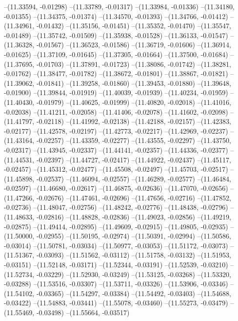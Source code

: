 --(11.33594, -0.01298)
--(11.33789, -0.01317)
--(11.33984, -0.01336)
--(11.34180, -0.01355)
--(11.34375, -0.01374)
--(11.34570, -0.01393)
--(11.34766, -0.01412)
--(11.34961, -0.01432)
--(11.35156, -0.01451)
--(11.35352, -0.01470)
--(11.35547, -0.01489)
--(11.35742, -0.01509)
--(11.35938, -0.01528)
--(11.36133, -0.01547)
--(11.36328, -0.01567)
--(11.36523, -0.01586)
--(11.36719, -0.01606)
--(11.36914, -0.01625)
--(11.37109, -0.01645)
--(11.37305, -0.01664)
--(11.37500, -0.01684)
--(11.37695, -0.01703)
--(11.37891, -0.01723)
--(11.38086, -0.01742)
--(11.38281, -0.01762)
--(11.38477, -0.01782)
--(11.38672, -0.01801)
--(11.38867, -0.01821)
--(11.39062, -0.01841)
--(11.39258, -0.01860)
--(11.39453, -0.01880)
--(11.39648, -0.01900)
--(11.39844, -0.01919)
--(11.40039, -0.01939)
--(11.40234, -0.01959)
--(11.40430, -0.01979)
--(11.40625, -0.01999)
--(11.40820, -0.02018)
--(11.41016, -0.02038)
--(11.41211, -0.02058)
--(11.41406, -0.02078)
--(11.41602, -0.02098)
--(11.41797, -0.02118)
--(11.41992, -0.02138)
--(11.42188, -0.02157)
--(11.42383, -0.02177)
--(11.42578, -0.02197)
--(11.42773, -0.02217)
--(11.42969, -0.02237)
--(11.43164, -0.02257)
--(11.43359, -0.02277)
--(11.43555, -0.02297)
--(11.43750, -0.02317)
--(11.43945, -0.02337)
--(11.44141, -0.02357)
--(11.44336, -0.02377)
--(11.44531, -0.02397)
--(11.44727, -0.02417)
--(11.44922, -0.02437)
--(11.45117, -0.02457)
--(11.45312, -0.02477)
--(11.45508, -0.02497)
--(11.45703, -0.02517)
--(11.45898, -0.02537)
--(11.46094, -0.02557)
--(11.46289, -0.02577)
--(11.46484, -0.02597)
--(11.46680, -0.02617)
--(11.46875, -0.02636)
--(11.47070, -0.02656)
--(11.47266, -0.02676)
--(11.47461, -0.02696)
--(11.47656, -0.02716)
--(11.47852, -0.02736)
--(11.48047, -0.02756)
--(11.48242, -0.02776)
--(11.48438, -0.02796)
--(11.48633, -0.02816)
--(11.48828, -0.02836)
--(11.49023, -0.02856)
--(11.49219, -0.02875)
--(11.49414, -0.02895)
--(11.49609, -0.02915)
--(11.49805, -0.02935)
--(11.50000, -0.02955)
--(11.50195, -0.02974)
--(11.50391, -0.02994)
--(11.50586, -0.03014)
--(11.50781, -0.03034)
--(11.50977, -0.03053)
--(11.51172, -0.03073)
--(11.51367, -0.03093)
--(11.51562, -0.03112)
--(11.51758, -0.03132)
--(11.51953, -0.03151)
--(11.52148, -0.03171)
--(11.52344, -0.03191)
--(11.52539, -0.03210)
--(11.52734, -0.03229)
--(11.52930, -0.03249)
--(11.53125, -0.03268)
--(11.53320, -0.03288)
--(11.53516, -0.03307)
--(11.53711, -0.03326)
--(11.53906, -0.03346)
--(11.54102, -0.03365)
--(11.54297, -0.03384)
--(11.54492, -0.03403)
--(11.54688, -0.03422)
--(11.54883, -0.03441)
--(11.55078, -0.03460)
--(11.55273, -0.03479)
--(11.55469, -0.03498)
--(11.55664, -0.03517)
